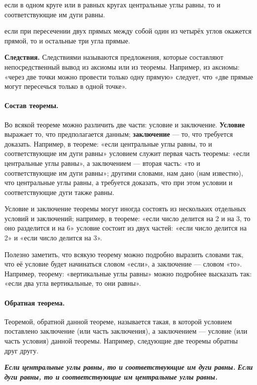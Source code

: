 если в одном круге или в равных кругах центральные углы равны, то и соответствующие им дуги равны.

если при пересечении двух прямых между собой один из четырёх углов окажется прямой, то и остальные три угла прямые.

\textbf{Следствия.}
Следствиями называются предложения, которые составляют непосредственный вывод из аксиомы или из теоремы.
Например, из аксиомы:
«через две точки можно провести только одну прямую» следует, что «две прямые могут пересечься только в одной точке».

\paragraph{Состав теоремы.}\label{1938/29}
Во всякой теореме можно различить две части:
условие и заключение.
\textbf{Условие} выражает то, что предполагается данным;
\textbf{заключение} — то, что требуется доказать.
Например, в теореме:
«если центральные углы равны, то и соответствующие им дуги равны» условием служит первая часть теоремы:
«если центральные углы равны», а заключением — вторая часть:
«то и соответствующие им дуги равны»;
другими словами, нам дано (нам известно), что центральные углы равны, а требуется доказать, что при этом условии и соответствующие дуги также равны.

Условие и заключение теоремы могут иногда состоять из нескольких отдельных условий и заключений;
например, в теореме:
«если число делится на 2 и на 3, то оно разделится и на 6» условие состоит из двух частей:
«если число делится на 2» и «если число делится на 3».

Полезно заметить, что всякую теорему можно подробно выразить словами так, что её условие будет начинаться словом «если», а заключение — словом «то».
Например, теорему:
«вертикальные углы равны» можно подробнее высказать так:
«если два угла вертикальные, то они равны».

\paragraph{Обратная теорема.}\label{1938/30}
Теоремой, обратной данной теореме, называется такая, в которой условием поставлено заключение (или часть заключения), а заключением — условие (или часть условия) данной теоремы.
Например, следующие две теоремы обратны друг другу.

\medskip

{
\sloppy

\setlength{\columnseprule}{.2pt}
\begin{paracol}{2}
\textbf{\emph{Если центральные углы равны, то и соответствующие им дуги равны.}}
\switchcolumn
\textbf{\emph{Если дуги равны, то и соответствующие им центральные углы равны.}}
\end{paracol}

}


